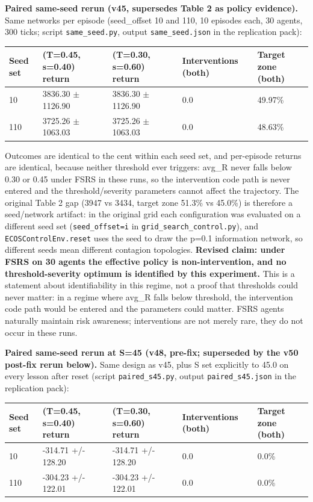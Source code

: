 \documentclass[11pt]{article}
\begin{document}
\textbf{Paired same-seed rerun (v45, supersedes Table 2 as policy evidence).} Same networks per episode (seed\_offset 10 and 110, 10 episodes each, 30 agents, 300 ticks; script \texttt{same\_seed.py}, output \texttt{same\_seed.json} in the replication pack):

\begin{table}[htbp]
\centering
\begin{tabular}{lllll}
\toprule
\textbf{Seed set} & \textbf{(T=0.45, s=0.40) return} & \textbf{(T=0.30, s=0.60) return} & \textbf{Interventions (both)} & \textbf{Target zone (both)} \\
\midrule
10 & 3836.30 $\pm$ 1126.90 & 3836.30 $\pm$ 1126.90 & 0.0 & 49.97\% \\
110 & 3725.26 $\pm$ 1063.03 & 3725.26 $\pm$ 1063.03 & 0.0 & 48.63\% \\
\bottomrule
\end{tabular}
\end{table}

Outcomes are identical to the cent within each seed set, and per-episode returns are identical, because neither threshold ever triggers: avg\_R never falls below 0.30 or 0.45 under FSRS in these runs, so the intervention code path is never entered and the threshold/severity parameters cannot affect the trajectory. The original Table 2 gap (3947 vs 3434, target zone 51.3\% vs 45.0\%) is therefore a seed/network artifact: in the original grid each configuration was evaluated on a different seed set (\texttt{seed\_offset=i} in \texttt{grid\_search\_control.py}), and \texttt{ECOSControlEnv.reset} uses the seed to draw the p=0.1 information network, so different seeds mean different contagion topologies. \textbf{Revised claim: under FSRS on 30 agents the effective policy is non-intervention, and no threshold-severity optimum is identified by this experiment.} This is a statement about identifiability in this regime, not a proof that thresholds could never matter: in a regime where avg\_R falls below threshold, the intervention code path would be entered and the parameters could matter. FSRS agents naturally maintain risk awareness; interventions are not merely rare, they do not occur in these runs.

\textbf{Paired same-seed rerun at S=45 (v48, pre-fix; superseded by the v50 post-fix rerun below).} Same design as v45, plus S set explicitly to 45.0 on every lesson after reset (script \texttt{paired\_s45.py}, output \texttt{paired\_s45.json} in the replication pack):

\begin{table}[htbp]
\centering
\begin{tabular}{lllll}
\toprule
\textbf{Seed set} & \textbf{(T=0.45, s=0.40) return} & \textbf{(T=0.30, s=0.60) return} & \textbf{Interventions (both)} & \textbf{Target zone (both)} \\
\midrule
10 & -314.71 +/- 128.20 & -314.71 +/- 128.20 & 0.0 & 0.0\% \\
110 & -304.23 +/- 122.01 & -304.23 +/- 122.01 & 0.0 & 0.0\% \\
\bottomrule
\end{tabular}
\end{table}
\end{document}
